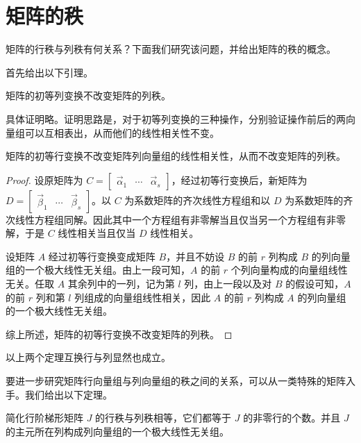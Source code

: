 
\section{矩阵的秩}

矩阵的行秩与列秩有何关系？下面我们研究该问题，并给出矩阵的秩的概念。

首先给出以下引理。

\begin{theorem}
	矩阵的初等列变换不改变矩阵的列秩。
\end{theorem}

具体证明略。证明思路是，对于初等列变换的三种操作，分别验证操作前后的两向量组可以互相表出，从而他们的线性相关性不变。

\begin{theorem}
	矩阵的初等行变换不改变矩阵列向量组的线性相关性，从而不改变矩阵的列秩。
\end{theorem}

\begin{proof}
	设原矩阵为 $C = \begin{bmatrix} \vec \alpha_1 & \cdots & \vec \alpha_s \end{bmatrix}$，经过初等行变换后，新矩阵为 $D = \begin{bmatrix} \vec \beta_1 & \cdots & \vec \beta_s \end{bmatrix}$。以 $C$ 为系数矩阵的齐次线性方程组和以 $D$ 为系数矩阵的齐次线性方程组同解。因此其中一个方程组有非零解当且仅当另一个方程组有非零解，于是 $C$ 线性相关当且仅当 $D$ 线性相关。

	设矩阵 $A$ 经过初等行变换变成矩阵 $B$，并且不妨设 $B$ 的前 $r$ 列构成 $B$ 的列向量组的一个极大线性无关组。由上一段可知，$A$ 的前 $r$ 个列向量构成的向量组线性无关。任取 $A$ 其余列中的一列，记为第 $l$ 列，由上一段以及对 $B$ 的假设可知，$A$ 的前 $r$ 列和第 $l$ 列组成的向量组线性相关，因此 $A$ 的前 $r$ 列构成 $A$ 的列向量组的一个极大线性无关组。

	综上所述，矩阵的初等行变换不改变矩阵的列秩。
\end{proof}

以上两个定理互换行与列显然也成立。

要进一步研究矩阵行向量组与列向量组的秩之间的关系，可以从一类特殊的矩阵入手。我们给出以下定理。

\begin{theorem}
	简化行阶梯形矩阵 $J$ 的行秩与列秩相等，它们都等于 $J$ 的非零行的个数。并且 $J$ 的主元所在列构成列向量组的一个极大线性无关组。
\end{theorem}

